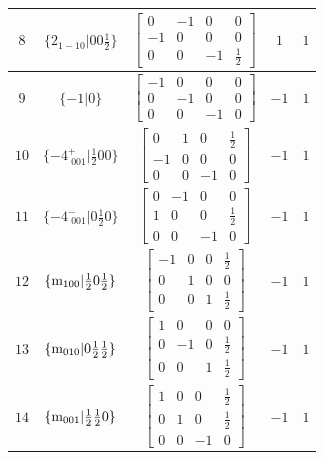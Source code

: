 \documentclass[fleqn,8pt]{jsarticle}
\begin{document}
\begin{longtable}{ccccc}
$ 8 $ & $ \{2{}_{1-10}|0 0 \frac{1}{2}\} $ & $ \begin{bmatrix} 0 & -1 & 0 & 0 \\ -1 & 0 & 0 & 0 \\ 0 & 0 & -1 & \frac{1}{2} \end{bmatrix} $ & $ 1 $ & $ 1 $ \\ \hline
$ 9 $ & $ \{-1|0\} $ & $ \begin{bmatrix} -1 & 0 & 0 & 0 \\ 0 & -1 & 0 & 0 \\ 0 & 0 & -1 & 0 \end{bmatrix} $ & $ -1 $ & $ 1 $ \\ \hline
$ 10 $ & $ \{-4^{+}_{\,\,001}|\frac{1}{2} 0 0\} $ & $ \begin{bmatrix} 0 & 1 & 0 & \frac{1}{2} \\ -1 & 0 & 0 & 0 \\ 0 & 0 & -1 & 0 \end{bmatrix} $ & $ -1 $ & $ 1 $ \\ \hline
$ 11 $ & $ \{-4^{-}_{\,\,001}|0 \frac{1}{2} 0\} $ & $ \begin{bmatrix} 0 & -1 & 0 & 0 \\ 1 & 0 & 0 & \frac{1}{2} \\ 0 & 0 & -1 & 0 \end{bmatrix} $ & $ -1 $ & $ 1 $ \\ \hline
$ 12 $ & $ \{{\rm m}_{100}|\frac{1}{2} 0 \frac{1}{2}\} $ & $ \begin{bmatrix} -1 & 0 & 0 & \frac{1}{2} \\ 0 & 1 & 0 & 0 \\ 0 & 0 & 1 & \frac{1}{2} \end{bmatrix} $ & $ -1 $ & $ 1 $ \\ \hline
$ 13 $ & $ \{{\rm m}_{010}|0 \frac{1}{2} \frac{1}{2}\} $ & $ \begin{bmatrix} 1 & 0 & 0 & 0 \\ 0 & -1 & 0 & \frac{1}{2} \\ 0 & 0 & 1 & \frac{1}{2} \end{bmatrix} $ & $ -1 $ & $ 1 $ \\ \hline
$ 14 $ & $ \{{\rm m}_{001}|\frac{1}{2} \frac{1}{2} 0\} $ & $ \begin{bmatrix} 1 & 0 & 0 & \frac{1}{2} \\ 0 & 1 & 0 & \frac{1}{2} \\ 0 & 0 & -1 & 0 \end{bmatrix} $ & $ -1 $ & $ 1 $ \\ \hline

\end{longtable}
\end{document}
